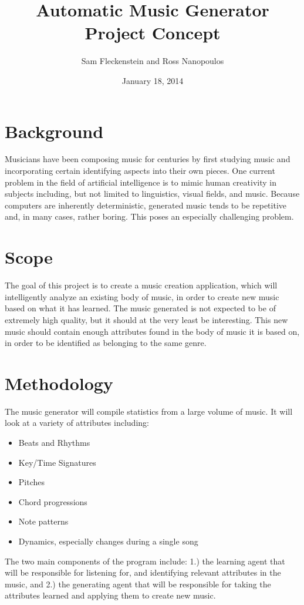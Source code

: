 \documentclass{article}
\begin{document}
\clearpage
{}
\begin{center}
\begin{minipage}{.6\textwidth}

\title{Automatic Music Generator \\ \vspace{2 pt} \Large{Project Concept}}
\author{Sam Fleckenstein and Ross Nanopoulos}
\date{January 18, 2014}
\maketitle

\end{minipage}
\end{center}
\clearpage

\section{Background}
Musicians have been composing music for centuries by first studying music and incorporating certain identifying aspects into their own pieces. One current problem in the field of artificial intelligence is to mimic human creativity in subjects including, but not limited to linguistics, visual fields, and music.  Because computers are inherently deterministic, generated music tends to be repetitive and, in many cases, rather boring.  This poses an especially challenging problem.

\section{Scope}
The goal of this project is to create a music creation application, which will intelligently  analyze an existing body of music, in order to create new music based on what it has learned. The music generated is not expected to be of extremely high quality, but it should at the very least be interesting. This new music should contain enough attributes found in the body of music it is based on, in order to be identified as belonging to the same genre.

\section{Methodology}
The music generator will compile statistics from a large volume of music.  It will look at a variety of attributes including:
\begin{itemize}
\item Beats and Rhythms
\item Key/Time Signatures
\item Pitches
\item Chord progressions
\item Note patterns
\item Dynamics, especially changes during a single song
\end{itemize}

The two main components of the program include: 1.) the learning agent that will be responsible for listening for, and identifying relevant attributes in the music, and 2.) the generating agent that will be responsible for taking the attributes learned and applying them to create new music.
\end{document}
